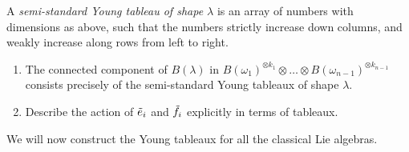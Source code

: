 \begin{definition}
A \emph{semi-standard Young tableau of shape $\lambda$} is an array of numbers
with dimensions as above, such that the numbers strictly increase down
columns, and weakly increase along rows from left to right.
\end{definition}

\begin{theorem}[Exercise]\leavevmode
\begin{enumerate}
  \item The connected component of $B(\lambda)$ in
    $B(\omega_1)^{\otimes k_1} \otimes \dots \otimes B(\omega_{n-1})^{\otimes k_{n-1}}$
    consists precisely of the semi-standard Young tableaux of shape $\lambda$.
  \item Describe the action of $\tilde{e}_i$ and $\tilde{f}_i$ explicitly in terms of
    tableaux.
\end{enumerate}
\end{theorem}

We will now construct the Young tableaux for all the classical Lie algebras.

